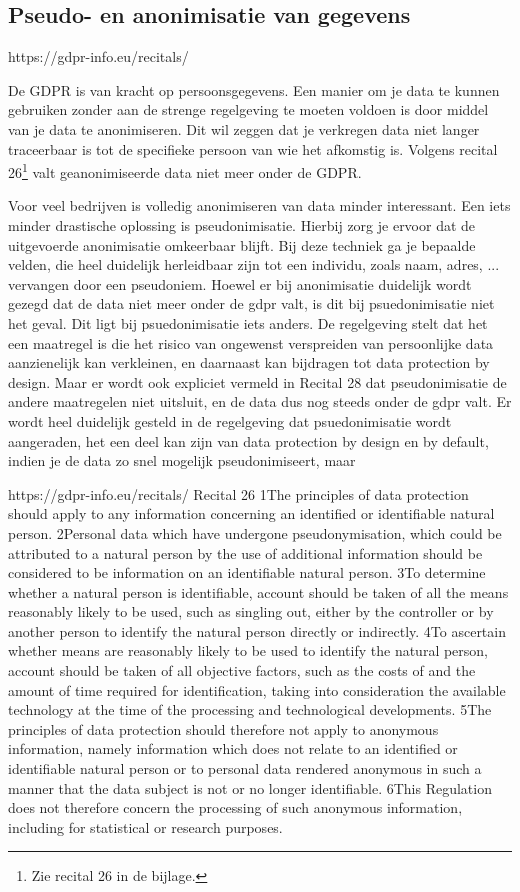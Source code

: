  

\subsection{Pseudo- en anonimisatie van gegevens}
https://gdpr-info.eu/recitals/


De GDPR is van kracht op persoonsgegevens. Een manier om je data te kunnen gebruiken zonder aan de strenge regelgeving te moeten voldoen is door middel van je data te anonimiseren. Dit wil zeggen dat je verkregen data niet langer traceerbaar is tot de specifieke persoon van wie het afkomstig is. Volgens recital 26\footnote{Zie recital 26 in de bijlage.} valt geanonimiseerde data niet meer onder de GDPR. 

Voor veel bedrijven is volledig anonimiseren van data minder interessant. Een iets minder drastische oplossing is pseudonimisatie. Hierbij zorg je ervoor dat de uitgevoerde anonimisatie omkeerbaar blijft.  
Bij deze techniek ga je bepaalde velden, die heel duidelijk herleidbaar zijn tot een individu, zoals naam, adres, ... vervangen door een pseudoniem.
Hoewel er bij anonimisatie duidelijk wordt gezegd dat de data niet meer onder de gdpr valt, is dit bij psuedonimisatie niet het geval. Dit ligt bij psuedonimisatie iets anders. De regelgeving stelt dat het een maatregel is die het risico van ongewenst verspreiden van persoonlijke data aanzienelijk kan verkleinen, en daarnaast kan bijdragen tot data protection by design. Maar er wordt ook expliciet vermeld in Recital 28 dat pseudonimisatie de andere maatregelen niet uitsluit, en de data dus nog steeds onder de gdpr valt. 
Er wordt heel duidelijk gesteld in de regelgeving dat psuedonimisatie wordt aangeraden, het een deel kan zijn van data protection by design en by default, indien je de data zo snel mogelijk pseudonimiseert, maar 

https://gdpr-info.eu/recitals/
Recital 26
1The principles of data protection should apply to any information concerning an identified or identifiable natural person. 2Personal data which have undergone pseudonymisation, which could be attributed to a natural person by the use of additional information should be considered to be information on an identifiable natural person. 3To determine whether a natural person is identifiable, account should be taken of all the means reasonably likely to be used, such as singling out, either by the controller or by another person to identify the natural person directly or indirectly. 4To ascertain whether means are reasonably likely to be used to identify the natural person, account should be taken of all objective factors, such as the costs of and the amount of time required for identification, taking into consideration the available technology at the time of the processing and technological developments. 5The principles of data protection should therefore not apply to anonymous information, namely information which does not relate to an identified or identifiable natural person or to personal data rendered anonymous in such a manner that the data subject is not or no longer identifiable. 6This Regulation does not therefore concern the processing of such anonymous information, including for statistical or research purposes.

